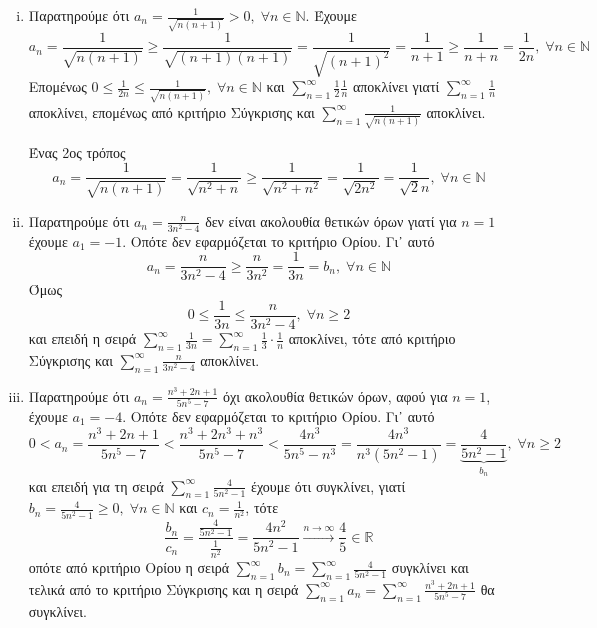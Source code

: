\documentclass[a4paper,table]{report}
\begin{document}
\begin{enumerate}
\begin{enumerate}[i)]
      \item Παρατηρούμε ότι $ a_{n} = \frac{1}{\sqrt{n(n+1)}} > 0, \; \forall n 
        \in \mathbb{N} $. Έχουμε
        \[
          a_{n} = \frac{1}{\sqrt{n(n+1)}} \geq \frac{1}{\sqrt{(n+1)(n+1)}} = 
          \frac{1}{\sqrt{(n+1)^{2}} } = \frac{1}{n+1} \geq \frac{1}{n+n} = 
          \frac{1}{2n}, \; \forall n \in \mathbb{N}   
        \] 
        Επομένως $ 0 \leq \frac{1}{2n} \leq \frac{1}{\sqrt{n(n+1)}}, \; 
        \forall n \in \mathbb{N} $ και $ \sum_{n=1}^{\infty} \frac{1}{2} 
        \frac{1}{n} $ αποκλίνει γιατί $ \sum_{n=1}^{\infty} \frac{1}{n} $ 
        αποκλίνει, επομένως από κριτήριο Σύγκρισης και 
        $ \sum_{n=1}^{\infty} \frac{1}{\sqrt{n(n+1)}} $ αποκλίνει.

        \begin{rem}
          Ένας 2ος τρόπος
          \[
            a_{n} = \frac{1}{\sqrt{n(n+1)}} = \frac{1}{\sqrt{n^{2}+n}} \geq 
            \frac{1}{\sqrt{n^{2}+n^{2}}} = \frac{1}{\sqrt{2n^{2}}} = 
            \frac{1}{\sqrt{2}n}, \; \forall n \in \mathbb{N}   
          \] 
        \end{rem}

      \item Παρατηρούμε ότι $ a_{n}= \frac{n}{3n^{2}-4} $ δεν είναι ακολουθία 
        θετικών όρων γιατί για $ n=1 $ έχουμε $ a_{1} = -1 $. Οπότε δεν 
        εφαρμόζεται το κριτήριο Ορίου. Γι᾽ αυτό 
        \[
          a_{n}= \frac{n}{3n^{2}-4} \geq \frac{n}{3n^{2}} = \frac{1}{3n} =b_{n}, 
          \; \forall n \in \mathbb{N}
        \] 
        Όμως 
        \[
          0 \leq \frac{1}{3n} \leq \frac{n}{3n^{2}-4}, \; \forall n \geq 2 
        \]
        και επειδή η σειρά $ \sum_{n=1}^{\infty} \frac{1}{3n} = 
        \sum_{n=1}^{\infty} \frac{1}{3} \cdot \frac{1}{n}$ αποκλίνει, 
        τότε από κριτήριο Σύγκρισης και 
        $ \sum_{n=1}^{\infty} \frac{n}{3n^{2}-4}$ αποκλίνει.


      \item Παρατηρούμε ότι $ a_{n}= \frac{n^{3}+2n+1}{5n^{5}-7} $ όχι 
        ακολουθία θετικών όρων, αφού για $ n=1 $, έχουμε $ a_{1}=-4$. Οπότε δεν 
        εφαρμόζεται το κριτήριο Ορίου. Γι᾽ αυτό
        \[
          0 < a_{n}= \frac{n^{3}+2n+1}{5n^{5}-7} < 
          \frac{n^{3}+2n^{3}+n^{3}}{5n^{5}-7} < \frac{4n^{3}}{5n^{5}-n^{3}} = 
          \frac{4n^{3}}{n^{3}(5n^{2}-1)} = \underbrace{\frac{4}{5n^{2}-1}}_
          {b_{n}}, \; \forall n \geq 2
        \] 
        και επειδή για τη σειρά $ \sum_{n=1}^{\infty} \frac{4}{5n^{2}-1} $ 
        έχουμε ότι συγκλίνει, γιατί 
        $
        b_{n} = \frac{4}{5n^{2}-1} \geq 0, \; \forall n \in \mathbb{N}
        $ 
        και $ c_{n} = \frac{1}{n^{2}} $, τότε
        \[
          \frac{b_{n}}{c_{n}} = \frac{\frac{4}{5n^{2}-1}}{\frac{1}{n^{2}}} = 
          \frac{4n^{2}}{5n^{2}-1} \xrightarrow{n \to \infty} \frac{4}{5} 
          \in \mathbb{R} 
        \]
        οπότε από κριτήριο Ορίου η σειρά $ \sum_{n=1}^{\infty} b_{n}= 
        \sum_{n=1}^{\infty} \frac{4}{5n^{2}-1}$ συγκλίνει και τελικά 
        από το κριτήριο Σύγκρισης
        και η σειρά $ \sum_{n=1}^{\infty} a_{n} = \sum_{n=1}^{\infty}
        \frac{n^{3}+2n+1}{5n^{5}-7} $ θα συγκλίνει.



\end{enumerate}
\end{enumerate}
\end{document}
